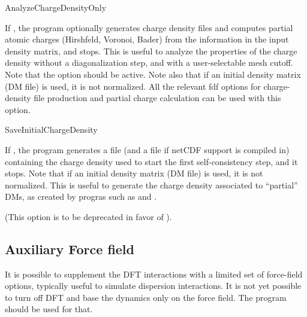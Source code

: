 \begin{fdflogicalF}{AnalyzeChargeDensityOnly}

  If \fdftrue, the program optionally generates charge density files
  and computes partial atomic charges (Hirshfeld, Voronoi, Bader) from
  the information in the input density matrix, and stops.  This is
  useful to analyze the properties of the charge density without a
  diagonalization step, and with a user-selectable mesh cutoff.  Note
  that the  option should be active.  Note also that
  if an initial density matrix (DM file) is used, it is not
  normalized. All the relevant fdf options for charge-density file
  production and partial charge calculation can be used with this option.

  \end{fdflogicalF}

  \begin{fdflogicalF}{SaveInitialChargeDensity}

  If \fdftrue, the program generates a 
  file (and a  file if netCDF support is
  compiled in) containing the charge density used to start the first
  self-consistency step, and it stops. Note that if an initial density
  matrix (DM file) is used, it is not normalized. This is useful to
  generate the charge density associated to ``partial'' DMs, as
  created by progras such as  and
  .

  (This option is to be deprecated in favor of ).
\end{fdflogicalF}
  

\subsection{Auxiliary Force field}

It is possible to supplement the DFT interactions with a limited
set of force-field options, typically useful to simulate dispersion
interactions. It is not yet possible to turn off DFT and base the
dynamics only on the force field. The  program should be
used for that.

